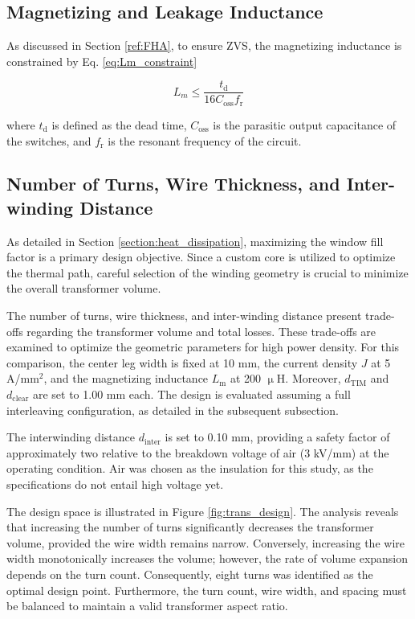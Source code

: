 \subsection{Magnetizing and Leakage Inductance}
As discussed in Section \ref{ref:FHA}, to ensure ZVS, the magnetizing inductance is constrained by Eq. \ref{eq:Lm_constraint}

\begin{equation}
L_m \le \frac{t_\mathrm{d}}{16 C_{\mathrm{oss}} f_{\mathrm{r}}}
\label{eq:Lm_constraint}
\end{equation}

\noindent where $t_{\mathrm{d}}$ is defined as the dead time, $C_{\mathrm{oss}}$ is the parasitic output capacitance of the switches, and $f_\mathrm{r}$ is the resonant frequency of the circuit.

\subsection{Number of Turns, Wire Thickness, and Inter-winding Distance}
\par As detailed in Section \ref{section:heat_dissipation}, maximizing the window fill factor is a primary design objective. Since a custom core is utilized to optimize the thermal path, careful selection of the winding geometry is crucial to minimize the overall transformer volume.

The number of turns, wire thickness, and inter-winding distance present trade-offs regarding the transformer volume and total losses. These trade-offs are examined to optimize the geometric parameters for high power density. For this comparison, the center leg width is fixed at 10 mm, the current density $J$ at 5 A/mm$^2$, and the magnetizing inductance $L_{\mathrm{m}}$ at 200 $\upmu$H. Moreover, $d_{\mathrm{TIM}}$ and $d_{\mathrm{clear}}$ are set to 1.00 mm each. The design is evaluated assuming a full interleaving configuration, as detailed in the subsequent subsection.

The interwinding distance $d_{\mathrm{inter}}$ is set to 0.10 mm, providing a safety factor of approximately two relative to the breakdown voltage of air (3 kV/mm) at the operating condition. Air was chosen as the insulation for this study, as the specifications do not entail high voltage yet. 

The design space is illustrated in Figure \ref{fig:trans_design}. The analysis reveals that increasing the number of turns significantly decreases the transformer volume, provided the wire width remains narrow. Conversely, increasing the wire width monotonically increases the volume; however, the rate of volume expansion depends on the turn count. Consequently, eight turns was identified as the optimal design point. Furthermore, the turn count, wire width, and spacing must be balanced to maintain a valid transformer aspect ratio.

